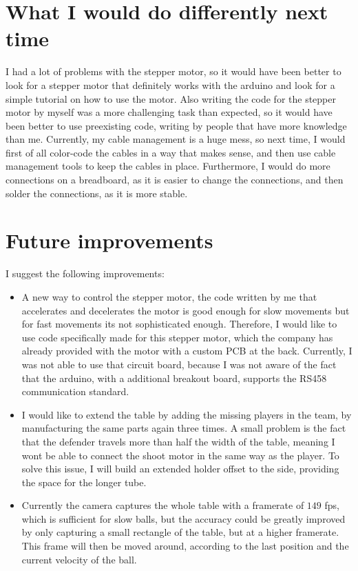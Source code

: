 \section{What I would do differently next time}\label{sec:different}
I had a lot of problems with the stepper motor, so it would have been better to look for a stepper motor that definitely works with the arduino and look for a simple tutorial on how to use the motor.
Also writing the code for the stepper motor by myself was a more challenging task than expected, so it would have been better to use preexisting code, writing by people that have more knowledge than me.
Currently, my cable management is a huge mess, so next time, I would first of all color-code the cables in a way that makes sense, and then use cable management tools to keep the cables in place.
Furthermore, I would do more connections on a breadboard, as it is easier to change the connections, and then solder the connections, as it is more stable.


\section{Future improvements}\label{sec:improvements}
I suggest the following improvements:
\begin{itemize}
    \item A new way to control the stepper motor, the code written by me that accelerates and decelerates the motor is good enough for slow movements but for fast movements its not sophisticated enough.
    Therefore, I would like to use code specifically made for this stepper motor, which the company has already provided with the motor with a custom PCB at the back.
    Currently, I was not able to use that circuit board, because I was not aware of the fact that the arduino, with a additional breakout board, supports the RS458 communication standard.
    \item I would like to extend the table by adding the missing players in the team, by manufacturing the same parts again three times.
    A small problem is the fact that the defender travels more than half the width of the table, meaning I wont be able to connect the shoot motor in the same way as the player.
    To solve this issue, I will build an extended holder offset to the side, providing the space for the longer tube.
    \item Currently the camera captures the whole table with a framerate of $149$ fps, which is sufficient for slow balls, but the accuracy could be greatly improved by only capturing a small rectangle of the table, but at a higher framerate.
    This frame will then be moved around, according to the last position and the current velocity of the ball.
\end{itemize}


